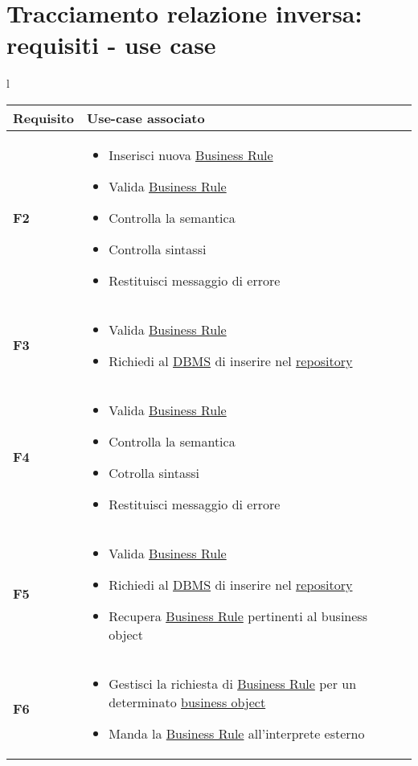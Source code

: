 \section{Tracciamento relazione inversa: requisiti - use case}
\large{
\begin{tabular}{l}
\begin{tabular}{||p{2cm}||p{10cm}||} \hline
\textbf{Requisito} & \textbf{Use-case associato} \\ \hline
\textbf {F2} & \begin{itemize}
\item Inserisci nuova \underline{Business Rule}
\item Valida \underline{Business Rule}
\item Controlla la semantica
\item Controlla sintassi
\item Restituisci messaggio di errore
\end{itemize} \\ \hline
\textbf{F3} & \begin{itemize}
\item Valida \underline{Business Rule}
\item Richiedi al \underline{DBMS} di inserire nel \underline{repository}
\end{itemize} \\ \hline
\textbf{F4} & \begin{itemize}
\item Valida \underline{Business Rule}
\item Controlla la semantica
\item Cotrolla sintassi
\item Restituisci messaggio di errore
\end{itemize} \\ \hline
\textbf{F5} & \begin{itemize}
\item Valida \underline{Business Rule}
\item Richiedi al \underline{DBMS} di inserire nel \underline{repository}
\item Recupera \underline{Business Rule} pertinenti al business object
\end{itemize} \\ \hline
\textbf{F6} & \begin{itemize}
\item Gestisci la richiesta di \underline{Business Rule} per un determinato \underline{business object}
\item Manda la \underline{Business Rule} all'interprete esterno
\end{itemize} \\ \hline
\end{tabular}
\end{tabular}

}
